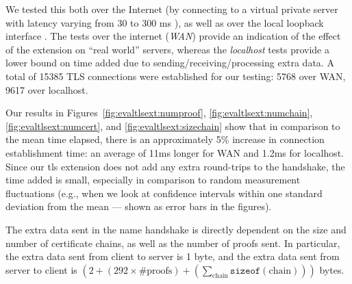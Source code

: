 We tested this both over the Internet (by connecting to a virtual private server
with latency varying from 30 to 300 ms ), as well
as over the local loopback interface . The
tests over the internet (\emph{WAN}) provide an indication of the effect of
the extension on ``real world'' servers, 
whereas the \emph{localhost} tests provide a lower bound on time added due to
sending/receiving/processing extra data. A total of 15385 TLS connections were
established for our testing: 5768 over WAN, 9617 over localhost.

Our results in Figures~\ref{fig:evaltlsext:numproof},
\ref{fig:evaltlsext:numchain}, \ref{fig:evaltlsext:numcert}, and
\ref{fig:evaltlsext:sizechain} show that in comparison to the mean time
elapsed, there is an approximately 5\% increase in connection establishment
time: an average of 11ms longer for WAN and 1.2ms for localhost. 
Since our \ac{tls} extension does not add any extra round-trips to the
handshake, the time added is small, especially in comparison to random
measurement fluctuations (e.g., when we look at confidence intervals within one
standard deviation from the mean --- shown as error bars in the figures).

The extra data sent in the \ac{name} handshake is directly dependent on the size
and number of certificate chains, as well as the number of proofs sent. In
particular, the extra data sent from client to server is 1 byte, and the extra
data sent from server to client is
$(2 + (292 \times \text{\#proofs}) +
(\sum_{\text{chain}}\texttt{sizeof}(\text{chain})))$ bytes. 
